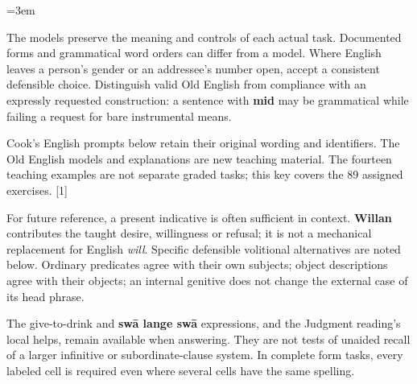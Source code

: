 \newcommand{\runningtitle}{Unit 10. Answer key}

\emergencystretch=3em
\newcommand{\itempara}[2]{\par\addvspace{3pt}\noindent\hangindent=1.8em\hangafter=1\makebox[1.8em][l]{#1.}#2\par}
\newcommand{\reserve}[1]{\par\penalty-100\begingroup\dimen0=\pagegoal\advance\dimen0 by-\pagetotal\ifdim\dimen0<#1\newpage\fi\endgroup}

\raggedright
{}

The models preserve the meaning and controls of each actual task. Documented forms and grammatical word orders can differ from a model. Where English leaves a person's gender or an addressee's number open, accept a consistent defensible choice. Distinguish valid Old English from compliance with an expressly requested construction: a sentence with \textbf{mid} may be grammatical while failing a request for bare instrumental means.

Cook's English prompts below retain their original wording and identifiers. The Old English models and explanations are new teaching material. The fourteen teaching examples are not separate graded tasks; this key covers the 89 assigned exercises. [1]

For future reference, a present indicative is often sufficient in context. \textbf{Willan} contributes the taught desire, willingness or refusal; it is not a mechanical replacement for English \emph{will}. Specific defensible volitional alternatives are noted below. Ordinary predicates agree with their own subjects; object descriptions agree with their objects; an internal genitive does not change the external case of its head phrase.

The give-to-drink and \textbf{swā lange swā} expressions, and the Judgment reading's local helps, remain available when answering. They are not tests of unaided recall of a larger infinitive or subordinate-clause system. In complete form tasks, every labeled cell is required even where several cells have the same spelling.

